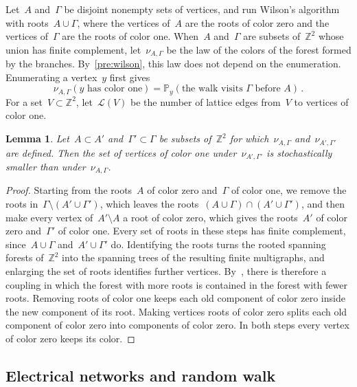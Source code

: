\documentclass[11pt]{amsart}
\numberwithin{equation}{section}
\newtheorem{lemma}[equation]{Lemma}
\newcommand{\Z}{\mathbb Z}
\newcommand{\PP}{\mathbb P}
\newcommand{\cL}{\mathscr{L}}
\begin{document}
Let~$A$ and~$\Gamma$ be disjoint nonempty sets of vertices, and run Wilson's algorithm with roots~$A\cup\Gamma$, where the vertices of~$A$ are the roots of color zero and the vertices of~$\Gamma$ are the roots of color one. When~$A$ and~$\Gamma$ are subsets of~$\Z^2$ whose union has finite complement, let~$\nu_{A,\Gamma}$ be the law of the colors of the forest formed by the branches. By~\eqref{pre:wilson}, this law does not depend on the enumeration. Enumerating a vertex~$y$ first gives
\begin{equation}\label{fo:color-marginal}
\nu_{A,\Gamma}(\text{$y$ has color one})=\PP_y(\text{the walk visits~$\Gamma$ before~$A$})\,.
\end{equation}
For a set~$V\subset\Z^2$, let~$\cL(V)$ be the number of lattice edges from~$V$ to vertices of color one.

\begin{lemma}\label{fo:lattice-monotonicity}
Let~$A\subset A'$ and~$\Gamma'\subset\Gamma$ be subsets of~$\Z^2$ for which~$\nu_{A,\Gamma}$ and~$\nu_{A',\Gamma'}$ are defined. Then the set of vertices of color one under~$\nu_{A',\Gamma'}$ is stochastically smaller than under~$\nu_{A,\Gamma}$.
\end{lemma}

\begin{proof}
Starting from the roots~$A$ of color zero and~$\Gamma$ of color one, we remove the roots in~$\Gamma\setminus(A'\cup\Gamma')$, which leaves the roots~$(A\cup\Gamma)\cap(A'\cup\Gamma')$, and then make every vertex of~$A'\setminus A$ a root of color zero, which gives the roots~$A'$ of color zero and~$\Gamma'$ of color one. Every set of roots in these steps has finite complement, since~$A\cup\Gamma$ and~$A'\cup\Gamma'$ do. Identifying the roots turns the rooted spanning forests of~$\Z^2$ into the spanning trees of the resulting finite multigraphs, and enlarging the set of roots identifies further vertices. By~\citet[Exercise~10.8 and Theorem~10.4]{LyonsPeres2016}, there is therefore a coupling in which the forest with more roots is contained in the forest with fewer roots. Removing roots of color one keeps each old component of color zero inside the new component of its root. Making vertices roots of color zero splits each old component of color zero into components of color zero. In both steps every vertex of color zero keeps its color.
\end{proof}

\subsection{Electrical networks and random walk}\label{ssec:prelim-electrical}
\end{document}
